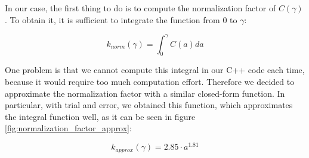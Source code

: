\documentclass{PoliMi_MasterThesis}
\begin{document}
In our case, the first thing to do is to compute the normalization factor of $C(\gamma)$. To obtain it, it is sufficient to integrate the function from $0$ to $\gamma$:

$$k_{norm}(\gamma)=\int_{0}^{\gamma} C(a) da$$

One problem is that we cannot compute this integral in our C++ code each time, because it would require too much computation effort. Therefore we decided to approximate the normalization factor with a similar closed-form function. In particular, with trial and error, we obtained this function, which approximates the integral function well, as it can be seen in figure \ref{fig:normalization_factor_approx}:

$$k_{approx}(\gamma) = 2.85\cdot a^{1.81}$$

\begin{figure}[H]
    \centering

\end{figure}
\end{document}
